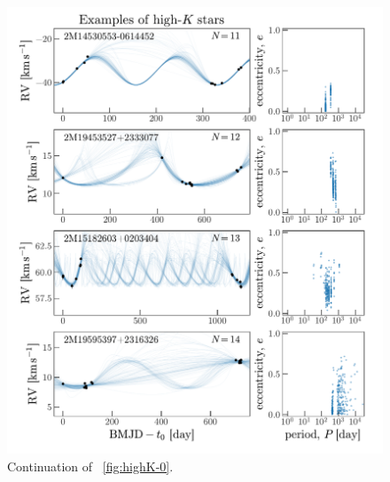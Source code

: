 \documentclass[modern, letterpaper]{aastex62}
\begin{document}
\begin{figure}[hp]
\begin{center}
\includegraphics[width=\textwidth]{highK-1}
\end{center}
\caption{%
Continuation of \figurename~\ref{fig:highK-0}.
\label{fig:highK-1}
}
\end{figure}
\end{document}
